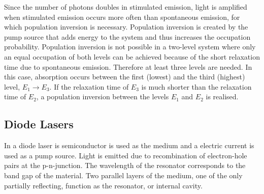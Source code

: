 Since the number of photons doubles in stimulated emission, light is amplified when 
stimulated emission occurs more often than spontaneous emission, for which population inversion
is necessary. Population inversion is created by the pump source that adds energy to the 
system and thus increases the occupation probability.                                                                                                                                                                                                                                                                                                                                                                                                                                                                                                                                                                                                         
Population inversion is not possible in a two-level system where only an equal occupation of 
both levels can be achieved because of the short relaxation time due to spontaneous emission.
Therefore at least three levels are needed. In this case, absorption occurs between the first (lowest)
and the third (highest) level, $E_1 \rightarrow E_3$. If the relaxation time of $E_3$ is 
much shorter than the relaxation time of $E_2$, a population inversion between the levels 
$E_1$ and $E_2$ is realised.

\subsection*{Diode Lasers}
In a diode laser is semiconductor is used as the medium and a electric current is used as a 
pump source. Light is emitted due to recombination of electron-hole pairs at the p-n-junction.
The wavelength of the resonator corresponds to the band gap of the material.
Two parallel layers of the medium, one of the only partially reflecting, function as the 
resonator, or internal cavity.